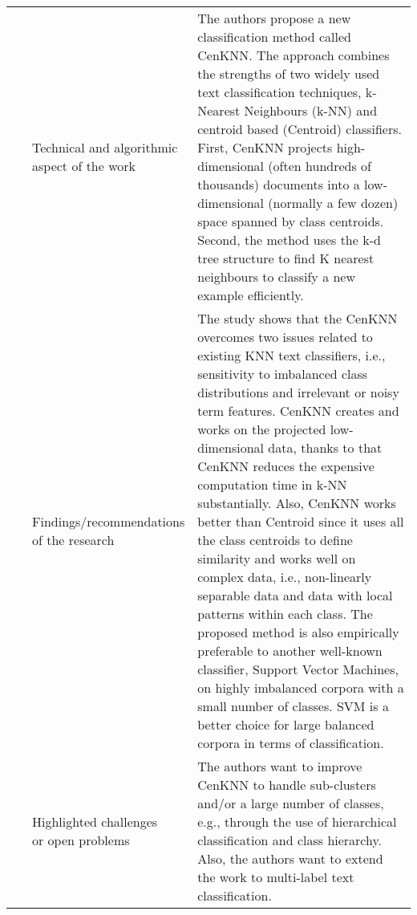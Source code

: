 \begin{landscape}
\begin{longtable}{lp{}p{}}
	\multirow{3}[0]{*}{~\citep{Pang2015}} & 
    \specialcell{Technical and algorithmic \\ aspect of the work} &
	The authors propose a new classification method called CenKNN. The approach combines the strengths of two widely used text classification techniques, k-Nearest Neighbours (k-NN) and centroid based (Centroid) classifiers. First, CenKNN projects high-dimensional (often hundreds of thousands) documents into a low-dimensional (normally a few dozen) space spanned by class centroids. Second, the method uses the k-d tree structure to find K nearest neighbours to classify a new example efficiently.
    \\ & 
    \specialcell{Findings/recommendations \\ of the research} & 
	The study shows that the CenKNN overcomes two issues related to existing KNN text classifiers, i.e., sensitivity to imbalanced class distributions and irrelevant or noisy term features. CenKNN creates and works on the projected low-dimensional data, thanks to that CenKNN reduces the expensive computation time in k-NN substantially. Also, CenKNN works better than Centroid since it uses all the class centroids to define similarity and works well on complex data, i.e., non-linearly separable data and data with local patterns within each class. The proposed method is also empirically preferable to another well-known classifier, Support Vector Machines, on highly imbalanced corpora with a small number of classes. SVM is a better choice for large balanced corpora in terms of classification.  
    \\ & 
    \specialcell{Highlighted challenges \\ or open problems} & 
	The authors want to improve CenKNN to handle sub-clusters and/or a large number of classes, e.g., through the use of hierarchical classification and class hierarchy. Also, the authors want to extend the work to multi-label text classification.
	\\
	

\end{longtable}
\end{landscape}

